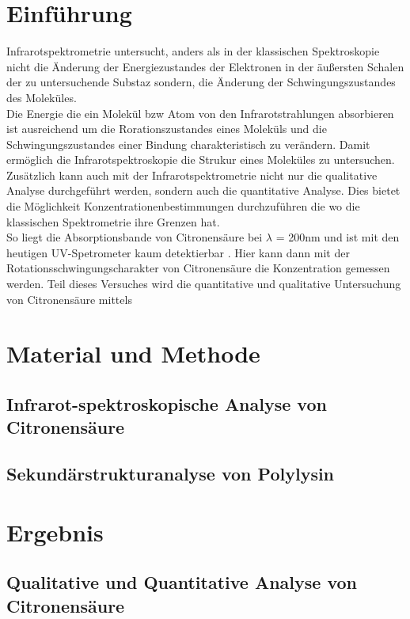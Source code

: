 \documentclass[10pt,a4paper]{article}
\begin{document}
	\section{Einführung}	
	Infrarotspektrometrie untersucht, anders als in der klassischen Spektroskopie nicht die Änderung der Energiezustandes der Elektronen in der äußersten Schalen der zu untersuchende Substaz sondern, die Änderung der Schwingungszustandes des Moleküles.\\
	Die Energie die ein Molekül bzw Atom von den Infrarotstrahlungen absorbieren ist ausreichend um die Rorationszustandes eines Moleküls und die Schwingungszustandes einer Bindung charakteristisch zu verändern.
	Damit ermöglich die Infrarotspektroskopie die Strukur eines Moleküles zu untersuchen.\\
	Zusätzlich kann auch mit der Infrarotspektrometrie nicht nur die qualitative Analyse durchgeführt werden, sondern auch die quantitative Analyse. Dies bietet die Möglichkeit Konzentrationenbestimmungen durchzuführen die wo die klassischen Spektrometrie ihre Grenzen hat.\\
	So liegt die Absorptionsbande von Citronensäure bei $\lambda$ = 200nm und ist mit den heutigen UV-Spetrometer kaum detektierbar \cite{Citricacid_UV}. Hier kann dann mit der Rotationsschwingungscharakter von Citronensäure die Konzentration gemessen werden.
	Teil dieses Versuches wird die quantitative und qualitative Untersuchung von Citronensäure mittels 
	
	
	
	
	
	
	
	
	
	\section{Material und Methode}
	\subsection{Infrarot-spektroskopische Analyse von Citronensäure}
	\subsection{Sekundärstrukturanalyse von Polylysin}
	
	
	\section{Ergebnis}
	\subsection{Qualitative und Quantitative Analyse von Citronensäure}
	
\end{document}
